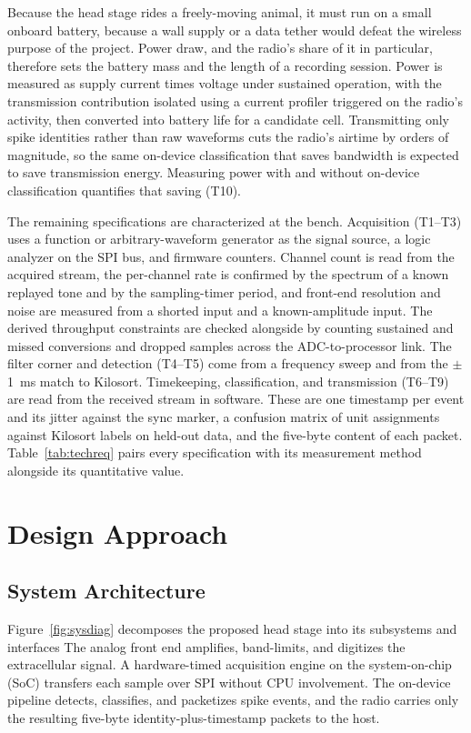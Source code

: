 \documentclass[11pt]{article}
\begin{document}
Because the head stage rides a freely-moving animal, it must run on a small onboard battery, because a
wall supply or a data tether would defeat the wireless purpose of the project. Power draw, and
the radio's share of it in particular, therefore sets the battery mass and the length of a
recording session. Power is measured as supply current times voltage under sustained
operation, with the transmission contribution isolated using a current profiler triggered on
the radio's activity, then converted into battery life for a candidate cell. Transmitting only
spike identities rather than raw waveforms cuts the radio's airtime by orders of magnitude, so
the same on-device classification that saves bandwidth is expected to save transmission energy.
Measuring power with and without on-device classification quantifies that saving (T10).

The remaining specifications are characterized at the bench. Acquisition (T1--T3) uses a
function or arbitrary-waveform generator as the signal source, a logic analyzer on the SPI
bus, and firmware counters. Channel count is read from the acquired stream, the per-channel
rate is confirmed by the spectrum of a known replayed tone and by the sampling-timer period,
and front-end resolution and noise are measured from a shorted input and a known-amplitude
input. The derived throughput constraints are checked alongside by counting sustained and missed
conversions and dropped samples across the ADC-to-processor link. The filter
corner and detection (T4--T5) come from a frequency sweep and from the
$\pm$1~ms match to Kilosort. Timekeeping, classification, and transmission (T6--T9) are read
from the received stream in software. These are one timestamp per event and its jitter against
the sync marker, a confusion matrix of unit assignments against Kilosort labels on held-out
data, and the five-byte content of each packet. Table~\ref{tab:techreq} pairs every specification with its
measurement method alongside its quantitative value.


\section{Design Approach}\label{sec:design}

\subsection{System Architecture}
Figure~\ref{fig:sysdiag} decomposes the proposed head stage into its subsystems and interfaces
The analog front end amplifies, band-limits, and digitizes the extracellular signal. A
hardware-timed acquisition engine on the system-on-chip (SoC) transfers each sample over
SPI without CPU involvement. The on-device pipeline detects, classifies, and packetizes
spike events, and the radio carries only the resulting five-byte identity-plus-timestamp
packets to the host.
\end{document}
